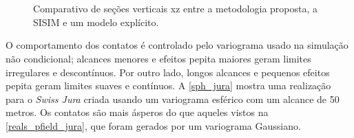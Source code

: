 \begin{figure}[H]
    \caption{Comparativo de seções verticais xz entre a metodologia proposta, a SISIM e um modelo explícito.} \label{sec_comp}
     \centering
     \\
     \\
\end{figure}

O comportamento dos contatos é controlado pelo variograma usado na simulação não condicional; alcances menores e efeitos pepita maiores geram limites irregulares e descontínuos. Por outro lado, longos alcances e pequenos efeitos pepita geram limites suaves e contínuos. A \autoref{sph_jura} mostra uma realização para o \textit{Swiss Jura} criada usando um variograma esférico com um alcance de 50 metros. Os contatos são mais ásperos do que aqueles vistos na \autoref{reals_pfield_jura}, que foram gerados por um variograma Gaussiano.

